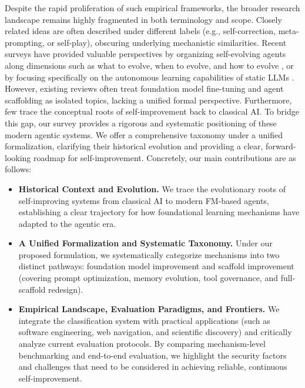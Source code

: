 Despite the rapid proliferation of such empirical frameworks, the broader research landscape remains highly fragmented in both terminology and scope. Closely related ideas are often described under different labels (e.g., self-correction, meta-prompting, or self-play), obscuring underlying mechanistic similarities. Recent surveys have provided valuable perspectives by organizing self-evolving agents along dimensions such as what to evolve, when to evolve, and how to evolve \citep{gao2025surveyselfevolvingagentspath, fang2025comprehensivesurveyselfevolvingai}, or by focusing specifically on the autonomous learning capabilities of static LLMs \citep{tao2024surveyselfevolutionlargelanguage}. 
However, existing reviews often treat foundation model fine-tuning and agent scaffolding as isolated topics, lacking a unified formal perspective. Furthermore, few trace the conceptual roots of self-improvement back to classical AI. To bridge this gap, our survey provides a rigorous and systematic positioning of these modern agentic systems. We offer a comprehensive taxonomy under a unified formalization, clarifying their historical evolution and providing a clear, forward-looking roadmap for self-improvement. Concretely, our main contributions are as follows:
\begin{itemize}
    \item \textbf{Historical Context and Evolution.} We trace the evolutionary roots of self-improving systems from classical AI to modern FM-based agents, establishing a clear trajectory for how foundational learning mechanisms have adapted to the agentic era.
    \item \textbf{A Unified Formalization and Systematic Taxonomy.} Under our proposed formulation, we systematically categorize mechanisms into two distinct pathways: foundation model improvement and  scaffold improvement (covering prompt optimization, memory evolution, tool governance, and full-scaffold redesign).    
    \item \textbf{Empirical Landscape, Evaluation Paradigms, and Frontiers.} We integrate the classification system with practical applications (such as software engineering, web navigation, and scientific discovery) and critically analyze current evaluation protocols. By comparing mechanism-level benchmarking and end-to-end evaluation, we highlight the security factors and challenges that need to be considered in achieving reliable, continuous self-improvement.
\end{itemize}


